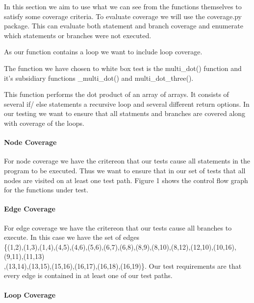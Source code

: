 In this section we aim to use what we can see from the functions themselves to satisfy some coverage
criteria. To evaluate coverage we will use the coverage.py package. This can evaluate both statement and branch coverage and enumerate which statements or branches were not executed.

As our function contains a loop we want to include loop coverage. 

The function we have chosen to white box test is the multi\_dot() function and it's subsidiary functions \_multi\_dot() and multi\_dot\_three().

This function performs the dot product of an array of arrays. It consists of several if/ else statements a recursive loop and several different return options. In our testing we want to ensure that all statments and branches are covered along with coverage of the loops. 



\paragraph{Node Coverage}


For node coverage we have the critereon that our tests cause all statements in the program to be executed. Thus we want to ensure that in our set of tests that all nodes are visited on at least one test path. Figure 1 shows the control flow graph for the functions under test. 



\paragraph{Edge Coverage}

For edge coverage we have the critereon that our tests cause all branches to execute. In this case we have the set of edges \\
\{(1,2),(1,3),(1,4),(4,5),(4,6),(5,6),(6,7),(6,8),(8,9),(8,10),(8,12),(12,10),(10,16),(9,11),(11,13)\\
,(13,14),(13,15),(15,16),(16,17),(16,18),(16,19)\}.
Our test requirements are that every edge is contained in at least one of our test paths.
\\

\paragraph{Loop Coverage}

